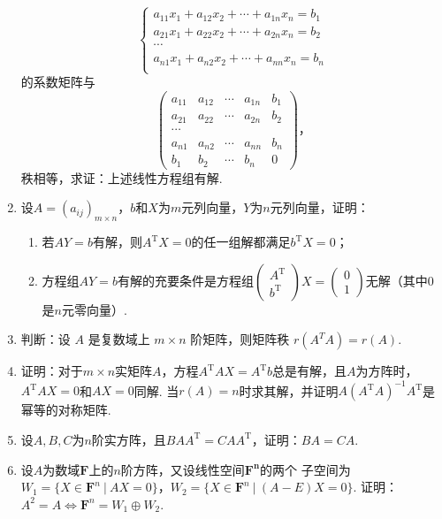\begin{enumerate}
    \[\begin{cases}
        a_{11}x_1+a_{12}x_2+\cdots+a_{1n}x_n=b_1 \\
        a_{21}x_1+a_{22}x_2+\cdots+a_{2n}x_n=b_2 \\
        \cdots \\
        a_{n1}x_1+a_{n2}x_2+\cdots+a_{nn}x_n=b_n \\
    \end{cases}\]
    的系数矩阵与
    \[\begin{pmatrix}
        a_{11} & a_{12} & \cdots & a_{1n} & b_1 \\
        a_{21} & a_{22} & \cdots & a_{2n} & b_2 \\
        \cdots \\
        a_{n1} & a_{n2} & \cdots & a_{nn} & b_n \\
        b_1 & b_2 & \cdots & b_n & 0
    \end{pmatrix}，\]
    秩相等，求证：上述线性方程组有解.
    \item 设$A=(a_{ij})_{m\times n}$，$b$和$X$为$m$元列向量，$Y$为$n$元列向量，证明：
    \begin{enumerate}
        \item 若$AY=b$有解，则$A^\mathrm{T}X=0$的任一组解都满足$b^\mathrm{T}X=0$；
        \item 方程组$AY=b$有解的充要条件是方程组$\begin{pmatrix}
            A^\mathrm{T} \\ b^\mathrm{T}
        \end{pmatrix}X=\begin{pmatrix}
            0 \\ 1
        \end{pmatrix}$无解（其中0是$n$元零向量）.
    \end{enumerate}
    \item 判断：设 $A$ 是复数域上 $m \times n$ 阶矩阵，则矩阵秩 $r\left(A^T A\right)=r(A)$.
	\item 证明：对于$m \times n$实矩阵$A$，方程$A^\mathrm{T}AX = A^\mathrm{T}b$总是有解，且$A$为方阵时，$A^\mathrm{T}AX = 0$和$AX=0$同解.
	当$r(A)=n$时求其解，并证明$A(A^\mathrm{T}A)^{-1}A^\mathrm{T}$是幂等的对称矩阵.
	\item 设$A,B,C$为$n$阶实方阵，且$BAA^\mathrm{T}=CAA^\mathrm{T}$，证明：$BA=CA$.
	\item 设$A$为数域$\mathbf{F}$上的$n$阶方阵，又设线性空间$\mathbf{F^n}$的两个
	子空间为$W_1=\{X\in\mathbf{F}^n\ |\ AX=0\}$，$W_2=\{X\in\mathbf{F}^n\ |\ (A-E)X=0\}$.
	证明：$A^2=A \iff \mathbf{F}^n=W_1\oplus W_2$.

\end{enumerate}
